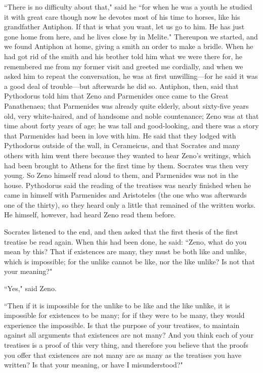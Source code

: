 \documentclass[letterpaper,12pt]{article}
\newcommand{\stephpag}[1]{\marginnote{\small\itshape\fontfamily{ppl}\selectfont #1}}
\begin{document}
``There is no difficulty about that," said he ``for when he was a youth he studied it with great care though now he devotes most of his time to horses, like his grandfather Antiphon. If that is what you want, let us go to him. He has just gone home from here, and he lives close by in Melite." \stephpag{127 a} Thereupon we started, and we found Antiphon at home, giving a smith an order to make a bridle. When he had got rid of the smith and his brother told him what we were there for, he remembered me from my former visit and greeted me cordially, and when we asked him to repeat the conversation, he was at first unwilling—for he said it was a good deal of trouble—but afterwards he did so. Antiphon, then, said that Pythodorus told him \stephpag{b} that Zeno and Parmenides once came to the Great Panathenaea; that Parmenides was already quite elderly, about sixty-five years old, very white-haired, and of handsome and noble countenance; Zeno was at that time about forty years of age; he was tall and good-looking, and there was a story that Parmenides had been in love with him. \stephpag{c} He said that they lodged with Pythodorus outside of the wall, in Cerameicus, and that Socrates and many others with him went there because they wanted to hear Zeno's writings, which had been brought to Athens for the first time by them. Socrates was then very young. So Zeno himself read aloud to them, and Parmenides was not in the house. \stephpag{d} Pythodorus said the reading of the treatises was nearly finished when he came in himself with Parmenides and Aristoteles (the one who was afterwards one of the thirty), so they heard only a little that remained of the written works. He himself, however, had heard Zeno read them before.

Socrates listened to the end, and then asked that the first thesis of the first treatise be read again. When this had been done, he said: \stephpag{e} ``Zeno, what do you mean by this? That if existences are many, they must be both like and unlike, which is impossible; for the unlike cannot be like, nor the like unlike? Is not that your meaning?"

``Yes," said Zeno.

``Then if it is impossible for the unlike to be like and the like unlike, it is impossible for existences to be many; for if they were to be many, they would experience the impossible. Is that the purpose of your treatises, to maintain against all arguments that existences are not many? And you think each of your treatises is a proof of this very thing, and therefore you believe that the proofs you offer that existences are not many are as many as the treatises you have written? Is that your meaning, \stephpag{128 a} or have I misunderstood?"
\end{document}
